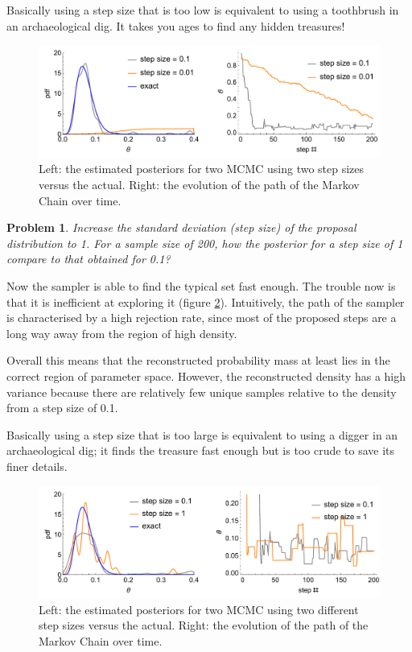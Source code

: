 \documentclass{article}
\newtheorem{problem}{Problem}[section]
\begin{document}
Basically using a step size that is too low is equivalent to using a toothbrush in an archaeological dig. It takes you ages to find any hidden treasures!

\begin{figure}[ht]
\centerline{\includegraphics[width=1\textwidth]{../figures/prob3_ticksStepSizeSmall.pdf}}
\caption{Left: the estimated posteriors for two MCMC using two step sizes versus the actual. Right: the evolution of the path of the Markov Chain over time.}\label{fig:ticks_stepSizeSmall}
\end{figure}

\begin{problem}
Increase the standard deviation (step size) of the proposal distribution to 1. For a sample size of 200, how the posterior for a step size of 1 compare to that obtained for 0.1?
\end{problem}

Now the sampler is able to find the typical set fast enough. The trouble now is that it is inefficient at exploring it (figure \ref{fig:ticks_stepSizeLarge}). Intuitively, the path of the sampler is characterised by a high rejection rate, since most of the proposed steps are a long way away from the region of high density.

Overall this means that the reconstructed probability mass at least lies in the correct region of parameter space. However, the reconstructed density has a high variance because there are relatively few unique samples relative to the density from a step size of 0.1.

Basically using a step size that is too large is equivalent to using a digger in an archaeological dig; it finds the treasure fast enough but is too crude to save its finer details.

\begin{figure}[ht]
\centerline{\includegraphics[width=1\textwidth]{../figures/prob3_ticksStepSizeLarge.pdf}}
\caption{Left: the estimated posteriors for two MCMC using two different step sizes versus the actual. Right: the evolution of the path of the Markov Chain over time.}\label{fig:ticks_stepSizeLarge}
\end{figure}
\end{document}
